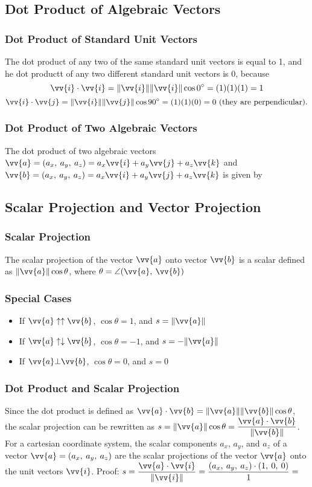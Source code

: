 \documentclass{article}
\newcommand{\mv}[1]{
	\lVert\vv{#1}\rVert
}
\begin{document}
	\subsection{Dot Product of Algebraic Vectors}
	\subsubsection{Dot Product of Standard Unit Vectors}
	The dot product of any two of the same standard unit vectors is equal to 1, and he dot productt of any two different standard unit vectors is 0, because
	\[\vv{i}\cdot\vv{i}=\mv{i}\mv{i}\cos\ang{0}=(1)(1)(1)=1\]\[\vv{i}\cdot\vv{j}=\mv{i}\mv{j}\cos\ang{90}=(1)(1)(0)=0 \text{ (they are perpendicular).}\]
	\subsubsection{Dot Product of Two Algebraic Vectors}
	The dot product of two algebraic vectors $\vv{a}=(a_x,\:a_y,\:a_z)=a_x\vv{i}+a_y\vv{j}+a_z\vv{k}$ and $\vv{b}=(a_x,\:a_y,\:a_z)=a_x\vv{i}+a_y\vv{j}+a_z\vv{k}$ is given by
	\subsection{Scalar Projection and Vector Projection}
	\subsubsection{Scalar Projection}
	The scalar projection of the vector $\vv{a}$ onto vector $\vv{b}$ is a scalar defined as $\mv{a}\cos\theta$, where $\theta=\angle(\vv{a},\:\vv{b})$
	\subsubsection{Special Cases}
	\begin{itemize}
		\item If $\vv{a}\uparrow\uparrow\vv{b}$, $\cos\theta=1$, and $s=\mv{a}$
		\item If $\vv{a}\uparrow\downarrow\vv{b}$, $\cos\theta=-1$, and $s=-\mv{a}$
		\item If $\vv{a}\bot\vv{b}$, $\cos\theta=0$, and $s=0$
	\end{itemize}
	\subsubsection{Dot Product and Scalar Projection}
	Since the dot product is defined as $\vv{a}\cdot\vv{b}=\mv{a}\mv{b}\cos\theta$, the scalar projection can be rewritten as $s=\mv{a}\cos\theta=\dfrac{\vv{a}\cdot\vv{b}}{\mv{b}}$. For a cartesian coordinate system, the scalar components $a_x$, $a_y$, and $a_z$ of a vector $\vv{a}=(a_x,\:a_y,\:a_z)$ are the scalar projections of the vector $\vv{a}$ onto the unit vectors $\vv{i}$. Proof: $s=\dfrac{\vv{a}\cdot\vv{i}}{\mv{i}}=\dfrac{(a_x,\:a_y,\:a_z)\cdot(1,\:0,\:0)}{1}=\dfrac{}{}$
\end{document}
